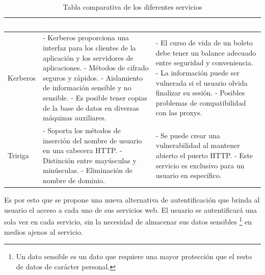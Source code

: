 \documentclass[12pt, a4paper, titlepage]{report}
\begin{document}
            \begin{table}[H]
        		\begin{tabular}{|p{2.4cm}|p{5cm}|p{5cm}|}
        			\hline
        			\rowcolor{guindapoli} & \textcolor{white}{\textbf{Ventajas}} & \textcolor{white}{\textbf{Desventajas}}\\
        			\hline
        			\cellcolor{azulclaro}Kerberos & 
        			    - Kerberos proporciona una interfaz para los clientes de la aplicación y los     servidores de aplicaciones.\newline
        			    - Métodos de cifrado seguros y rápidos.\newline
        			    - Aislamiento de información sensible y no sensible.\newline
        			    - Es posible tener copias de la base de datos en diversas máquinas auxiliares.
        			&   - El curso de vida de un boleto debe tener un balance adecuado entre seguridad y conveniencia. \newline 
        			    - La información puede ser vulnerada si el usuario olvida finalizar su sesión.\newline
        			    - Posibles problemas de compatibilidad con las proxys.\\ 
        			\hline
        			\cellcolor{azulclaro}Tririga & 
        			    - Soporta los métodos de inserción del nombre de usuario en una cabecera HTTP. \newline 
            			- Distinción entre mayúsculas y minúsculas. 
            			\newline 
            			- Eliminación de nombre de dominio.
            			\newline
        			&   - Se puede crear una vulnerabilidad al mantener abierto el puerto               HTTP.\newline 
        			    - Este servicio es exclusivo para un usuario en específico.\\
        			\hline
        		\end{tabular}
        	    \caption[Tabla comparativa de estado del arte]{Tabla comparativa de los diferentes servicios}
            \end{table}
            Es por esto que se propone una nueva alternativa de autentificación que brinda al usuario el acceso a cada uno de sus servicios web. El usuario se autentificará una sola vez en cada servicio, sin la necesidad de almacenar sus datos sensibles \footnote{Un dato sensible es un dato que requiere una mayor protección que el resto de datos de carácter personal.} en medios ajenos al servicio.
		
\end{document}
